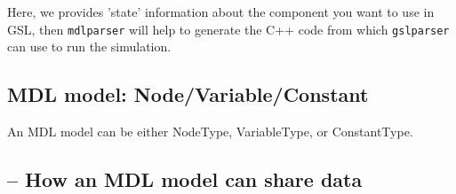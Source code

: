 Here, we provides 'state' information about the component you want to use in
GSL, then \verb!mdlparser! will help to generate the C++ code from which
\verb!gslparser! can use to run the simulation.

\subsection{MDL model: Node/Variable/Constant}
\label{sec:MDL-model}

An MDL model can be either NodeType, VariableType, or ConstantType.

\subsection{-- How an MDL model can share data}

